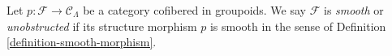 \begin{definition}
\label{definition-cofibered-groupoid-projection-smooth}
Let $p : \mathcal{F} \to \mathcal{C}_\Lambda$ be a category cofibered in
groupoids. We say $\mathcal{F}$ is {\it smooth} or {\it unobstructed}
if its structure morphism $p$ is smooth
in the sense of Definition \ref{definition-smooth-morphism}.
\end{definition}